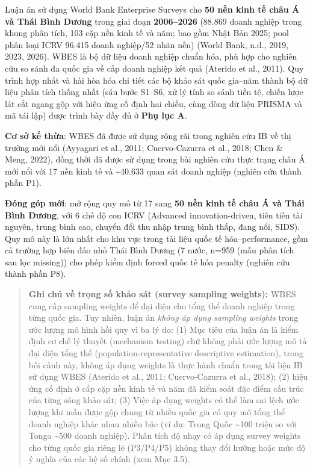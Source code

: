 \documentclass[
  a4paper,
  13pt]{extreport}
\begin{document}
Luận án sử dụng World Bank Enterprise Surveys cho \textbf{50 nền kinh tế
châu Á và Thái Bình Dương} trong giai đoạn \textbf{2006--2026} (88.869
doanh nghiệp trong khung phân tích, 103 cặp nền kinh tế và năm; bao gồm
Nhật Bản 2025; pool phân loại ICRV 96.415 doanh nghiệp/52 nhãn nền)
(World Bank, n.d., 2019, 2023, 2026). WBES là bộ dữ liệu doanh nghiệp
chuẩn hóa, phù hợp cho nghiên cứu so sánh đa quốc gia về cấp doanh
nghiệp kết quả (Aterido et al., 2011). Quy trình hợp nhất và hài hòa hóa
chi tiết các bộ khảo sát quốc gia--năm thành bộ dữ liệu phân tích thống
nhất (sáu bước S1--S6, xử lý tính so sánh tiền tệ, chiến lược lát cắt
ngang gộp với hiệu ứng cố định hai chiều, cùng dòng dữ liệu PRISMA và mã
tái lập) được trình bày đầy đủ ở \textbf{Phụ lục A}.

\textbf{Cơ sở kế thừa}: WBES đã được sử dụng rộng rãi trong nghiên cứu
IB về thị trường mới nổi (Ayyagari et al., 2011; Cuervo-Cazurra et al.,
2018; Chen \& Meng, 2022), đồng thời đã được sử dụng trong bài nghiên
cứu thực trạng châu Á mới nổi với 17 nền kinh tế và
\textasciitilde40.633 quan sát doanh nghiệp (nghiên cứu thành phần P1).

\textbf{Đóng góp mới}: mở rộng quy mô từ 17 sang \textbf{50 nền kinh tế
châu Á và Thái Bình Dương}, với 6 chế độ con ICRV (Advanced
innovation-driven, tiên tiến tài nguyên, trung bình cao, chuyển đổi thu
nhập trung bình thấp, đang nổi, SIDS). Quy mô này là lớn nhất cho khu
vực trong tài liệu quốc tế hóa--performance, gồm cả trường hợp biên đảo
nhỏ Thái Bình Dương (7 nước, n=959 (mẫu phân tích sau lọc missing)) cho
phép kiểm định forced quốc tế hóa penalty (nghiên cứu thành phần P8).

\begin{quote}
\textbf{Ghi chú về trọng số khảo sát (survey sampling weights):} WBES
cung cấp sampling weights để đại diện cho tổng thể doanh nghiệp trong
từng quốc gia. Tuy nhiên, luận án \emph{không áp dụng sampling weights}
trong ước lượng mô hình hồi quy vì ba lý do: (1) Mục tiêu của luận án là
kiểm định cơ chế lý thuyết (mechanism testing) chứ không phải ước lượng
mô tả đại diện tổng thể (population-representative descriptive
estimation), trong bối cảnh này, không áp dụng weights là thực hành
chuẩn trong tài liệu IB sử dụng WBES (Aterido et al., 2011;
Cuervo-Cazurra et al., 2018); (2) hiệu ứng cố định ở cấp cặp nền kinh tế
và năm đã kiểm soát đặc điểm cấu trúc của từng sóng khảo sát; (3) Việc
áp dụng weights có thể làm sai lệch ước lượng khi mẫu được gộp chung từ
nhiều quốc gia có quy mô tổng thể doanh nghiệp khác nhau nhiều bậc (ví
dụ: Trung Quốc \textasciitilde100 triệu so với Tonga \textasciitilde500
doanh nghiệp). Phân tích độ nhạy có áp dụng survey weights cho từng quốc
gia riêng lẻ (P3/P4/P5) không thay đổi hướng hoặc mức độ ý nghĩa của các
hệ số chính (xem Mục 3.5).
\end{quote}
\end{document}
